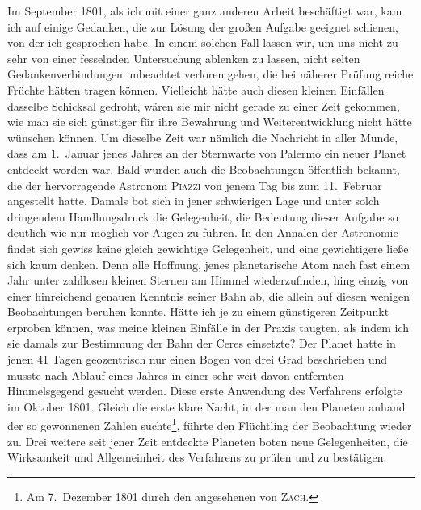 Im September 1801, als ich mit einer ganz anderen Arbeit beschäftigt war, kam ich auf einige Gedanken, die zur Lösung der großen Aufgabe geeignet schienen, von der ich gesprochen habe. In einem solchen Fall lassen wir, um uns nicht zu sehr von einer fesselnden Untersuchung ablenken zu lassen, nicht selten Gedankenverbindungen unbeachtet verloren gehen, die bei näherer Prüfung reiche Früchte hätten tragen können. Vielleicht hätte auch diesen kleinen Einfällen dasselbe Schicksal gedroht, wären sie mir nicht gerade zu einer Zeit gekommen, wie man sie sich günstiger für ihre Bewahrung und Weiterentwicklung nicht hätte wünschen können. Um dieselbe Zeit war nämlich die Nachricht in aller Munde, dass am 1.~Januar jenes Jahres an der Sternwarte von Palermo ein neuer Planet entdeckt worden war. Bald wurden auch die Beobachtungen öffentlich bekannt, die der hervorragende Astronom \textsc{Piazzi} von
jenem Tag bis zum 11.~Februar angestellt hatte. Damals bot sich in jener schwierigen Lage und unter solch dringendem Handlungsdruck die Gelegenheit, die Bedeutung dieser Aufgabe so deutlich wie nur möglich vor Augen zu führen. In den Annalen der Astronomie findet sich gewiss keine gleich gewichtige Gelegenheit, und eine gewichtigere ließe sich kaum denken. Denn alle Hoffnung, jenes planetarische Atom nach fast einem Jahr unter zahllosen kleinen Sternen am Himmel wiederzufinden, hing einzig von einer hinreichend genauen Kenntnis seiner Bahn ab, die allein auf diesen wenigen Beobachtungen beruhen konnte. Hätte ich je zu einem günstigeren Zeitpunkt erproben können, was meine kleinen Einfälle in der Praxis taugten, als indem ich sie damals zur Bestimmung der Bahn der Ceres einsetzte? Der Planet hatte in jenen 41 Tagen geozentrisch nur einen Bogen von drei Grad beschrieben und musste nach Ablauf eines Jahres in einer sehr weit davon entfernten Himmelsgegend gesucht werden. Diese erste Anwendung des Verfahrens erfolgte im Oktober 1801. Gleich die erste klare Nacht, in der man den Planeten anhand der so gewonnenen Zahlen suchte\footnote{Am 7.~Dezember 1801 durch den angesehenen von \textsc{Zach}.}, führte den Flüchtling der Beobachtung wieder zu. Drei weitere seit jener Zeit entdeckte Planeten boten neue Gelegenheiten, die Wirksamkeit und Allgemeinheit des Verfahrens zu prüfen und zu bestätigen.

